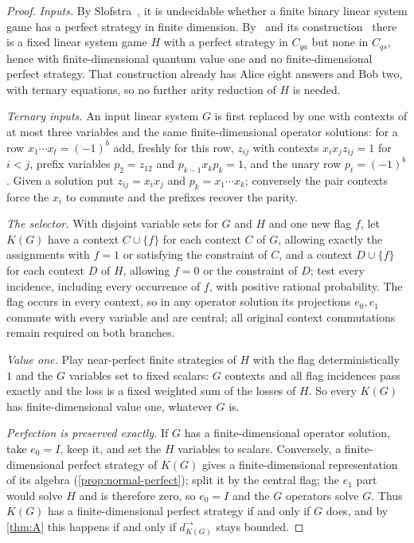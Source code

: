 \begin{proof}
\emph{Inputs.} By Slofstra~\cite[Corollary~1.4]{Slo19}, it is undecidable whether a finite binary linear system game has a
perfect strategy in finite dimension. By~\cite[Theorem~1.1]{Slo19} and its construction~\cite[\S4,
\S5, Proposition~5.1 and Remark~5.5]{Slo19} there is a fixed linear system game $H$ with a perfect strategy in $C_{qa}$
but none in $C_{qs}$, hence with finite-dimensional quantum value one and no finite-dimensional perfect strategy. That
construction already has Alice eight answers and Bob two, with ternary equations, so no further arity reduction of $H$ is
needed.

\emph{Ternary inputs.} An input linear system $G$ is first replaced by one with contexts of at most three variables and
the same finite-dimensional operator solutions: for a row $x_1\cdots x_t=(-1)^b$ add, freshly for this row, $z_{ij}$ with
contexts $x_ix_jz_{ij}=1$ for $i<j$, prefix variables $p_2=z_{12}$ and $p_{k-1}x_kp_k=1$, and the unary row $p_t=(-1)^b$.
Given a solution put $z_{ij}=x_ix_j$ and $p_k=x_1\cdots x_k$; conversely the pair contexts force the $x_i$ to commute and
the prefixes recover the parity.

\emph{The selector.} With disjoint variable sets for $G$ and $H$ and one new flag $f$, let $K(G)$ have a context $C\cup\{f\}$
for each context $C$ of $G$, allowing exactly the assignments with $f=1$ or satisfying the constraint of $C$, and a context
$D\cup\{f\}$ for each context $D$ of $H$, allowing $f=0$ or the constraint of $D$; test every incidence, including every
occurrence of $f$, with positive rational probability. The flag occurs in every context, so in any operator solution its
projections $e_0,e_1$ commute with every variable and are central; all original context commutations remain required on
both branches.

\emph{Value one.} Play near-perfect finite strategies of $H$ with the flag deterministically $1$ and the $G$ variables set
to fixed scalars: $G$ contexts and all flag incidences pass exactly and the loss is a fixed weighted sum of the losses of
$H$. So every $K(G)$ has finite-dimensional value one, whatever $G$ is.

\emph{Perfection is preserved exactly.} If $G$ has a finite-dimensional operator solution, take $e_0=I$, keep it, and set
the $H$ variables to scalars. Conversely, a finite-dimensional perfect strategy of $K(G)$ gives a finite-dimensional
representation of its algebra (\cref{prop:normal-perfect}); split it by the central flag; the $e_1$ part would solve $H$
and is therefore zero, so $e_0=I$ and the $G$ operators solve $G$. Thus $K(G)$ has a finite-dimensional perfect strategy
if and only if $G$ does, and by \cref{thm:A} this happens if and only if $d_{K(G)}^\to$ stays bounded.


\end{proof}
